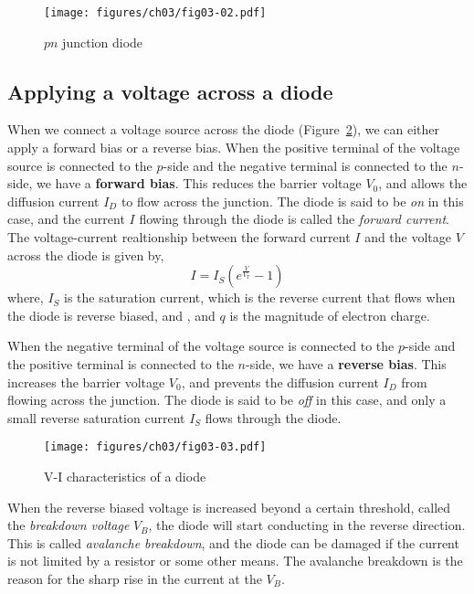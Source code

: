 \begin{figure}[t]
    \centering
    \texttt{[image: figures/ch03/fig03-02.pdf]}
    \caption{$pn$ junction diode}
    \label{fig:03-02}
\end{figure}

\subsection{Applying a voltage across a diode}
When we connect a voltage source across the diode (Figure~\ref{fig:03-diode-vi}), we can either apply a forward bias or a reverse bias. When the positive terminal of the voltage source is connected to the $p$-side and the negative terminal is connected to the $n$-side, we have a \textbf{forward bias}. This reduces the barrier voltage $V_0$, and allows the diffusion current $I_D$ to flow across the junction. The diode is said to be \textit{on} in this case, and the current $I$ flowing through the diode is called the \textit{forward current}. The voltage-current realtionship between the forward current $I$ and the voltage $V$ across the diode is given by,
\begin{equation}
    I = I_S \left( e^{\frac{V}{V_T}} - 1 \right)
    \label{eq:ch03-forward-bias-vi}
\end{equation}
where, $I_S$ is the saturation current, which is the reverse current that flows when the diode is reverse biased, and , and $q$ is the magnitude of electron charge.

When the negative terminal of the voltage source is connected to the $p$-side and the positive terminal is connected to the $n$-side, we have a \textbf{reverse bias}. This increases the barrier voltage $V_0$, and prevents the diffusion current $I_D$ from flowing across the junction. The diode is said to be \textit{off} in this case, and only a small reverse saturation current $I_S$ flows through the diode.
\begin{figure}[t]
    \centering
    \texttt{[image: figures/ch03/fig03-03.pdf]}
    \caption{V-I characteristics of a diode}
    \label{fig:03-diode-vi}
\end{figure}
When the reverse biased voltage is increased beyond a certain threshold, called the \textit{breakdown voltage} $V_B$, the diode will start conducting in the reverse direction. This is called \textit{avalanche breakdown}, and the diode can be damaged if the current is not limited by a resistor or some other means. The avalanche breakdown is the reason for the sharp rise in the current at the $V_B$.

